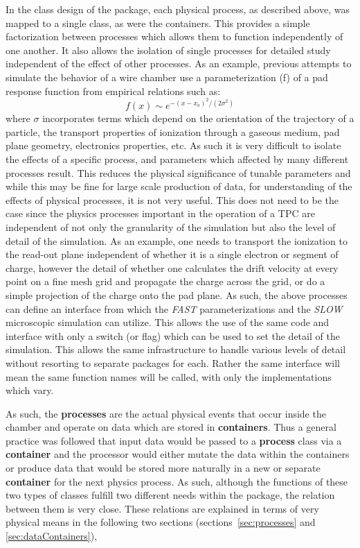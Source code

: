 \documentclass[twoside]{article}
\begin{document}
In the class design of the package, each physical process, 
as described above, was mapped to a single class, as were the containers.
This provides a simple factorization 
between processes which allows them to function independently of
one another.  It also allows the isolation of single processes
for detailed study independent of the effect of other
processes.  As an example, previous attempts to simulate the
behavior of a wire chamber use a parameterization (f) of a 
pad response function from empirical relations such as:
\begin{equation}
f(x) \sim  e^{-(x-x_{o})^{2}/(2 \sigma^{2})}
\label{eq:alephPRF}
\end{equation}
where $\sigma$ incorporates terms which depend on the orientation of the
trajectory of a particle, the transport properties
of ionization through a gaseous medium, pad plane geometry, 
electronics properties, etc.  As such it is very difficult to isolate
the effects of a specific process, and parameters which affected
by many different processes result. This reduces the physical significance
of tunable parameters and while this may be fine for large scale production
of data, for understanding of the effects of physical processes, it is
not very useful.  This does not need to be the case since
the physics processes important in the operation of a TPC are
independent of not only the granularity of the simulation but also
the level of detail of the simulation.  As an example, one needs to
transport the ionization to the read-out plane independent of whether 
it is a single electron or segment of charge, however the detail of
whether one calculates the drift velocity at every point on a fine
mesh grid and propagate the charge across the grid, or do a simple
projection of the charge onto the pad plane.  As such, the above processes
can define an interface from which the {\em FAST}  parameterizations
and the {\em SLOW} microscopic simulation can utilize.  This allows
the use of the same code and interface with only a 
switch (or flag) which can be used to set the detail of
the simulation.  This allows the same infrastructure to handle
various levels of detail without resorting to separate packages for each.
Rather the same interface will mean the same function names
will be called, with only the implementations which vary.

As such, the {\bf processes} are the actual physical events that occur 
inside the chamber
and operate on data which are stored in {\bf containers}.  Thus a general
practice was followed that input data would be passed to a {\bf process} class
via a {\bf container} and the processor would either
mutate the data within the containers or produce data that would
be stored more naturally in a new or separate {\bf container} for the next
physics process.  As such, although the functions of these two types
of classes fulfill two different needs within the package, the relation
between them is very close.  These relations are explained in terms of
very physical means in the following two sections 
(sections~\ref{sec:processes} and \ref{sec:dataContainers}),
\end{document}
